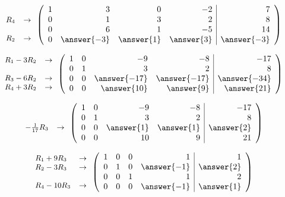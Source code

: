 \documentclass{ximera}
\begin{document}
\begin{exercise}
\begin{prompt}
\[
{\small
\begin{array}{lr}
  &    \\  
R_4  & \rightarrow  \\
  &   \\
R_2  &  \rightarrow \\  
\end{array}
}
\left(\begin{array}{rrrr|r}
     1 &  3 &  0 &  -2 &  7 \\
     0 &  1 &  3 &   2 &  8 \\
     0 &  6 &  1 &  -5 &  14 \\
     0 &  \answer{-3} &  \answer{1} &  \answer{3} & \answer{-3} 
\end{array}\right)
\]

\[
{\small
\begin{array}{lr}
R_1-3R_2  & \rightarrow   \\  
   &   \\
R_3-6R_2  & \rightarrow  \\
R_4+3R_2  & \rightarrow \\  
\end{array}
}
\left(\begin{array}{rrrr|r}
     1 &  0 &  -9 &  -8 &  -17 \\
     0 &  1 &  3 &   2 &  8 \\
     0 &  0 &  \answer{-17} &  \answer{-17} &  \answer{-34} \\
     0 &  0 &  \answer{10} &  \answer{9} & \answer{21} 
\end{array}\right)
\]

\[
{\small
\begin{array}{lr}
   &   \\  
   &   \\
-\tfrac{1}{17}R_3  & \rightarrow  \\
   &  \\  
\end{array}
}
\left(\begin{array}{rrrr|r}
     1 &  0 &  -9 &  -8 &  -17 \\
     0 &  1 &  3 &   2 &  8 \\
     0 &  0 &  \answer{1} &   \answer{1} &  \answer{2} \\
     0 &  0 &  10 &  9 & 21 
\end{array}\right)
\]

\[
{\small
\begin{array}{lr}
R_1+9R_3  & \rightarrow   \\  
R_2-3R_3   & \rightarrow  \\
  &   \\
R_4-10R_3  & \rightarrow \\  
\end{array}
}
\left(\begin{array}{rrrr|r}
     1 &  0 &  0 &   1 &  1 \\
     0 &  1 &  0 &   \answer{-1} &  \answer{2} \\
     0 &  0 &  1 &   1 &  2 \\
     0 &  0 &  0 &   \answer{-1} & \answer{1} 
\end{array}\right)
\]


\end{prompt}
\end{exercise}
\end{document}
